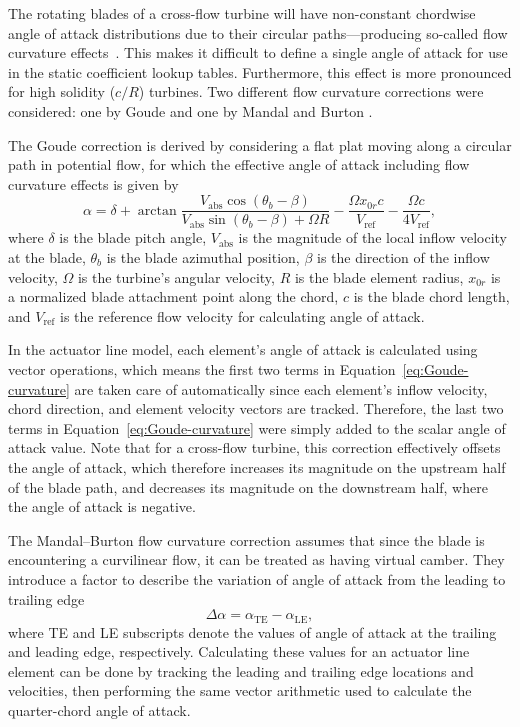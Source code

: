 The rotating blades of a cross-flow turbine will have non-constant chordwise
angle of attack distributions due to their circular paths---producing so-called
flow curvature effects~\cite{Migliore1980}. This makes it difficult to define a
single angle of attack for use in the static coefficient lookup tables.
Furthermore, this effect is more pronounced for high solidity ($c/R$) turbines.
Two different flow curvature corrections were considered: one by Goude
\cite{Goude2012} and one by Mandal and Burton \cite{Mandal1994}.

The Goude correction is derived by considering a flat plat moving along a
circular path in potential flow, for which the effective angle of attack
including flow curvature effects is given by
\begin{equation}
    \alpha = \delta + \arctan \frac{V_\mathrm{abs} \cos(\theta_b -
        \beta)}{V_\mathrm{abs} \sin(\theta_b - \beta) + \Omega R} - \frac{\Omega
        x_{0r}c}{V_\mathrm{ref}} - \frac{\Omega c}{4 V_\mathrm{ref}},
    \label{eq:Goude-curvature}
\end{equation}
where $\delta$ is the blade pitch angle, $V_\mathrm{abs}$ is the magnitude of
the local inflow velocity at the blade, $\theta_b$ is the blade azimuthal
position, $\beta$ is the direction of the inflow velocity, $\Omega$ is the
turbine's angular velocity, $R$ is the blade element radius, $x_{0r}$ is a
normalized blade attachment point along the chord, $c$ is the blade chord
length, and $V_\mathrm{ref}$ is the reference flow velocity for calculating
angle of attack.

In the actuator line model, each element's angle of attack is calculated using
vector operations, which means the first two terms in
Equation~\ref{eq:Goude-curvature} are taken care of automatically since each
element's inflow velocity, chord direction, and element velocity vectors are
tracked. Therefore, the last two terms in Equation~\ref{eq:Goude-curvature} were
simply added to the scalar angle of attack value. Note that for a cross-flow
turbine, this correction effectively offsets the angle of attack, which
therefore increases its magnitude on the upstream half of the blade path, and
decreases its magnitude on the downstream half, where the angle of attack is
negative.

The Mandal--Burton flow curvature correction assumes that since the blade is
encountering a curvilinear flow, it can be treated as having virtual camber.
They introduce a factor to describe the variation of angle of attack from the
leading to trailing edge
\begin{equation}
    \Delta \alpha = \alpha_\mathrm{TE} - \alpha_\mathrm{LE},
    \label{eq:Mandal-Burton-alpha-diff}
\end{equation}
where TE and LE subscripts denote the values of angle of attack at the trailing
and leading edge, respectively. Calculating these values for an actuator line
element can be done by tracking the leading and trailing edge locations and
velocities, then performing the same vector arithmetic used to calculate the
quarter-chord angle of attack.

